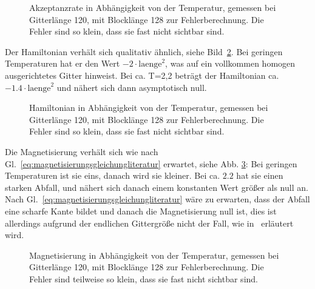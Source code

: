 	\begin{figure}[htbp]
		
		\caption[Akzeptanzrate in Abhängigkeit von der Temperatur]{Akzeptanzrate in Abhängigkeit von der Temperatur, gemessen bei Gitterlänge 120, mit Blocklänge 128 zur Fehlerberechnung. Die Fehler sind so klein, dass sie fast nicht sichtbar sind.}
		\label{fig:ergebnisakzeptanzrate}
	\end{figure}
	
	Der Hamiltonian verhält sich qualitativ ähnlich, siehe Bild~\ref{fig:ergebnishamiltonian}. Bei geringen Temperaturen hat er den Wert $-2\cdot\text{laenge}^2$, was auf ein vollkommen homogen ausgerichtetes Gitter hinweist. Bei ca.{} T=2,2 beträgt der Hamiltonian ca.{} $-\num{1,4}\cdot\text{laenge}^2$ und nähert sich dann asymptotisch null.
	
	
	
	
	\begin{figure}[htbp]
		
		\caption[Hamiltonian in Abhängigkeit von der Temperatur]{Hamiltonian in Abhängigkeit von der Temperatur, gemessen bei Gitterlänge 120, mit Blocklänge 128 zur Fehlerberechnung. Die Fehler sind so klein, dass sie fast nicht sichtbar sind.}
		\label{fig:ergebnishamiltonian}
	\end{figure}
	

	Die Magnetisierung verhält sich wie nach Gl.~\ref{eq:magnetisierungsgleichungliteratur} erwartet, siehe Abb. \ref{fig:ergebnismagnetisierung}: Bei geringen Temperaturen ist sie eins, danach wird sie kleiner. Bei ca. $\num{2,2}$ hat sie einen starken Abfall, und nähert sich danach einem konstanten Wert größer als null an. Nach Gl.~\ref{eq:magnetisierungsgleichungliteratur} wäre zu erwarten, dass der Abfall eine scharfe Kante bildet und danach die Magnetisierung null ist, dies ist allerdings aufgrund der endlichen Gittergröße nicht der Fall, wie in~\cite[S. 45 f.]{binderheermann} erläutert wird.
	

	
	\begin{figure}[htbp]
		
		\caption[Magnetisierung in Abhängigkeit von der Temperatur]{Magnetisierung in Abhängigkeit von der Temperatur, gemessen bei Gitterlänge 120, mit Blocklänge 128 zur Fehlerberechnung. Die Fehler sind teilweise so klein, dass sie fast nicht sichtbar sind.}
		\label{fig:ergebnismagnetisierung}
	\end{figure}
	
